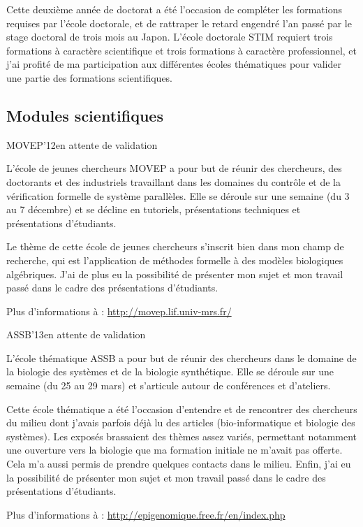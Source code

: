 Cette deuxième année de doctorat a été l'occasion de compléter les formations requises par l'école doctorale,
et de rattraper le retard engendré l'an passé par le stage doctoral de trois mois au Japon.
L'école doctorale STIM requiert trois formations à caractère scientifique et trois formations à caractère professionnel,
et j'ai profité de ma participation aux différentes écoles thématiques pour valider une partie des formations scientifiques.

\subsection{Modules scientifiques}

\formation
{MOVEP'12}{en attente de validation}
{L'école de jeunes chercheurs MOVEP a pour but de réunir des chercheurs, des doctorants et des industriels travaillant dans les domaines du contrôle et de la vérification formelle de système parallèles. Elle se déroule sur une semaine (du 3 au 7 décembre) et se décline en tutoriels, présentations techniques et présentations d'étudiants.

Le thème de cette école de jeunes chercheurs s'inscrit bien dans mon champ de recherche, qui est l'application de méthodes formelle à des modèles biologiques algébriques. J'ai de plus eu la possibilité de présenter mon sujet et mon travail passé dans le cadre des présentations d'étudiants.

Plus d'informations à : \url{http://movep.lif.univ-mrs.fr/}}

\formation
{ASSB'13}{en attente de validation}
{L'école thématique ASSB a pour but de réunir des chercheurs dans le domaine de la biologie des systèmes et de la biologie synthétique. Elle se déroule sur une semaine (du 25 au 29 mars) et s'articule autour de conférences et d'ateliers.

Cette école thématique a été l'occasion d'entendre et de rencontrer des chercheurs du milieu dont j'avais parfois déjà lu des articles (bio-informatique et biologie des systèmes). Les exposés brassaient des thèmes assez variés, permettant notamment une ouverture vers la biologie que ma formation initiale ne m'avait pas offerte. Cela m'a aussi permis de prendre quelques contacts dans le milieu. Enfin, j'ai eu la possibilité de présenter mon sujet et mon travail passé dans le cadre des présentations d'étudiants.

Plus d'informations à : \url{http://epigenomique.free.fr/en/index.php}}

